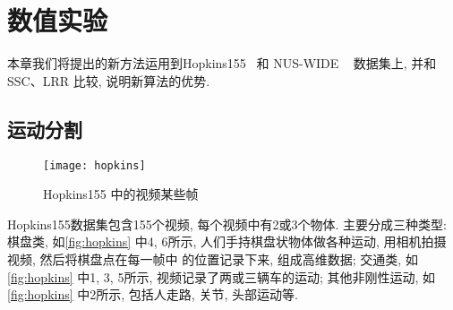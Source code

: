 \chapter{数值实验}\label{chp:experiments}
本章我们将提出的新方法运用到Hopkins155~\cite{tron2007benchmark} 和 NUS-WIDE
~\cite{chua2009NUS} 数据集上, 并和SSC、LRR 比较, 说明新算法的优势.

\section{运动分割}
\begin{figure}[hb]
  \centering
  \texttt{[image: hopkins]}
  \caption{Hopkins155 中的视频某些帧}
  \label{fig:hopkins}
\end{figure}
Hopkins155数据集包含155个视频, 每个视频中有2或3个物体.
主要分成三种类型: 棋盘类, 如\autoref{fig:hopkins} 中4, 6所示,
人们手持棋盘状物体做各种运动, 用相机拍摄视频, 然后将棋盘点在每一帧中
的位置记录下来, 组成高维数据; 交通类, 如\autoref{fig:hopkins} 中1, 3, 5所示,
视频记录了两或三辆车的运动; 其他非刚性运动, 如\autoref{fig:hopkins} 中2所示,
包括人走路, 关节, 头部运动等.

